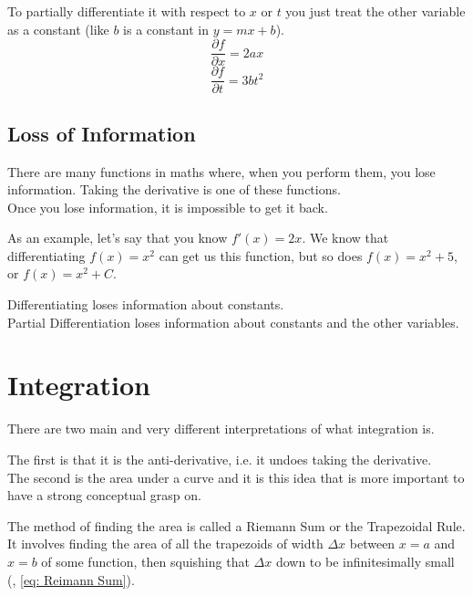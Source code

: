 \documentclass[main.tex]{subfiles}
\begin{document}
                To partially differentiate it with respect to $x$ or $t$ you just treat the other variable as a constant (like $b$ is a constant in $y=mx + b$).
                \begin{equation}
                    \frac{\partial f}{\partial x} = 2ax
                \end{equation}
                \begin{equation}
                    \frac{\partial f}{\partial t} = 3bt^2
                \end{equation}

            \subsection{Loss of Information}
                \label{subsec: Loss of Information in Differentiation}

                There are many functions in maths where, when you perform them, you lose information. Taking the derivative is one of these functions.\\
                Once you lose information, it is impossible to get it back.

                As an example, let's say that you know $f'(x) = 2x$. We know that differentiating $f(x)=x^2$ can get us this function, but so does $f(x)=x^2 + 5$, or $f(x)=x^2 + C$.

                Differentiating loses information about constants.\\
                Partial Differentiation loses information about constants and the other variables.




        \newpage
        \section{Integration}
            \label{sec: Integration}

            There are two main and very different interpretations of what integration is. 

            The first is that it is the anti-derivative, i.e. it undoes taking the derivative.\\
            The second is the area under a curve and it is this idea that is more important to have a strong conceptual grasp on.

            The method of finding the area is called a Riemann Sum or the Trapezoidal Rule. It involves finding the area of all the trapezoids of width $\Delta x$ between $x=a$ and $x=b$ of some function, then squishing that $\Delta x$ down to be infinitesimally small (, \eqref{eq: Reimann Sum}).
\end{document}
